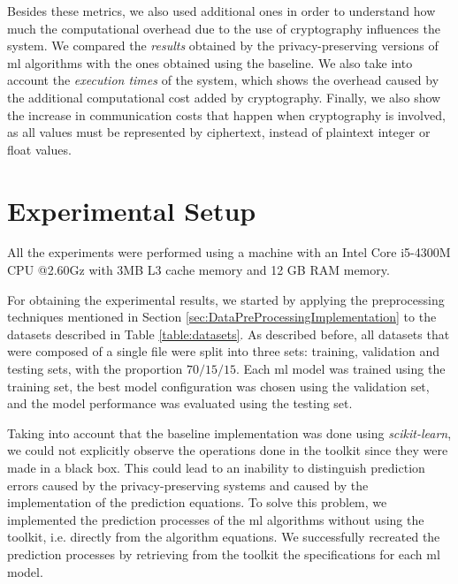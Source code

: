Besides these metrics, we also used additional ones in order to understand how much the computational overhead due to the use of cryptography influences the system.
We compared the \emph{results} obtained by the privacy-preserving versions of \ac{ml} algorithms with the ones obtained using the baseline. We also take into account the \emph{execution times} of the system, which shows the overhead caused by the additional computational cost added by cryptography.
Finally, we also show the increase in communication costs that happen when cryptography is involved, as all values must be represented by ciphertext, instead of plaintext integer or float values.


\section{Experimental Setup}
\label{sec:ExperimentalSetup}

All the experiments were performed using a machine with an Intel Core i5-4300M CPU @2.60Gz with 3MB L3 cache memory and 12 GB RAM memory.

For obtaining the experimental results, we started by applying the preprocessing techniques mentioned in Section \ref{sec:DataPreProcessingImplementation} to the datasets described in Table \ref{table:datasets}. As described before, all datasets that were composed of a single file were split into three sets: training, validation and testing sets, with the proportion $70/15/15$. Each \ac{ml} model was trained using the training set, the best model configuration was chosen using the validation set, and the model performance was evaluated using the testing set.

Taking into account that the baseline implementation was done using \textit{scikit-learn}, we could not explicitly observe the operations done in the toolkit since they were made in a black box. This could lead to an inability to distinguish prediction errors caused by the privacy-preserving systems and caused by the implementation of the prediction equations. To solve this problem, we implemented the prediction processes of the \ac{ml} algorithms without using the toolkit, i.e. directly from the algorithm equations.
We successfully recreated the prediction processes by retrieving from the toolkit the specifications for each \ac{ml} model.

